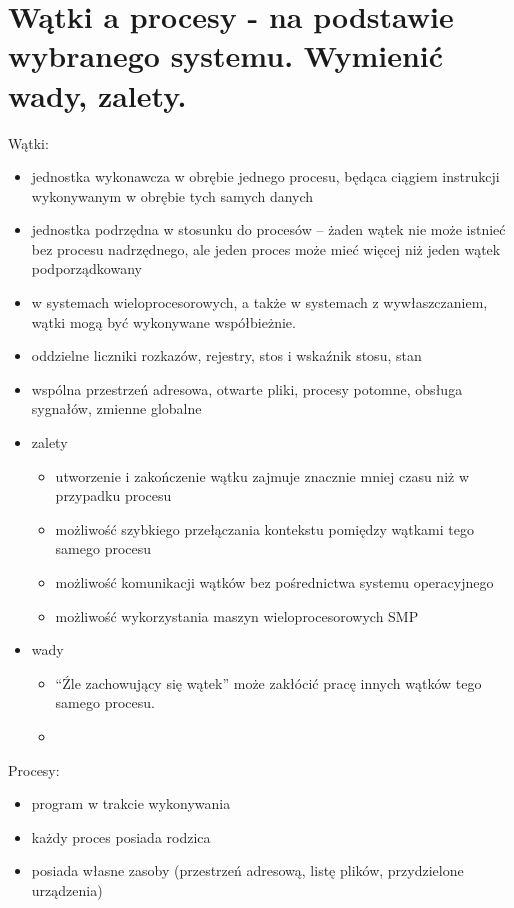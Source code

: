 \documentclass[12pt,a4paper]{article}
\begin{document}
	\section{Wątki a procesy - na podstawie wybranego systemu. Wymienić wady, zalety.}
	Wątki:
	\begin{itemize}
		\item jednostka wykonawcza w obrębie jednego procesu, będąca ciągiem instrukcji wykonywanym w obrębie tych samych danych
		\item jednostka podrzędna w stosunku do procesów – żaden wątek nie może istnieć bez procesu nadrzędnego, ale jeden proces może mieć więcej niż jeden wątek podporządkowany
		\item w systemach wieloprocesorowych, a także w systemach z wywłaszczaniem, wątki mogą być wykonywane współbieżnie.
		\item oddzielne liczniki rozkazów, rejestry, stos i wskaźnik stosu, stan
		\item wspólna przestrzeń adresowa, otwarte pliki, procesy potomne, obsługa sygnałów, zmienne globalne
		\item zalety
		\begin{itemize}
			\item utworzenie i zakończenie wątku zajmuje znacznie mniej czasu niż w przypadku procesu
			\item możliwość szybkiego przełączania kontekstu pomiędzy wątkami tego samego procesu
			\item możliwość komunikacji wątków bez pośrednictwa systemu operacyjnego
			\item możliwość wykorzystania maszyn wieloprocesorowych SMP
		\end{itemize}
		\item wady
		\begin{itemize}
			\item “Źle zachowujący się wątek” może zakłócić pracę innych wątków tego samego procesu.
			\item 
		\end{itemize}
	\end{itemize}
	
	Procesy:
	\begin{itemize}
		\item program w trakcie wykonywania
		\item każdy proces posiada rodzica
		\item posiada własne zasoby (przestrzeń adresową, listę plików, przydzielone urządzenia)
	\end{itemize}
\end{document}
